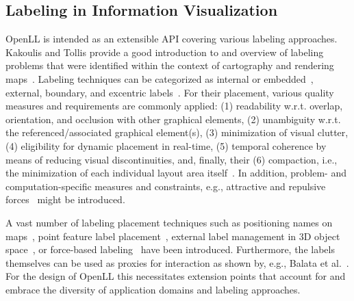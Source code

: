 \subsection{Labeling in Information Visualization} 
\noindent
OpenLL is intended as an extensible API covering various labeling approaches.
Kakoulis and Tollis provide a good introduction to and overview of labeling problems that were identified within the context of cartography and rendering maps~\cite{Kakoulis2013}.
Labeling techniques can be categorized as internal or embedded~\cite{Maass2007}, external, boundary, and excentric labels~\cite{Oeltze-Jafra2014}.
For their placement, various quality measures and requirements are commonly applied:
(1) readability w.r.t. overlap, orientation, and occlusion with other graphical elements, 
(2) unambiguity w.r.t. the referenced/associated graphical element(s), 
(3) minimization of visual clutter, 
(4) eligibility for dynamic placement in real-time,
(5) temporal coherence by means of reducing visual discontinuities, and, finally, their
(6) compaction, i.e., the minimization of each individual layout area itself~\cite{Ali05}.
In addition, problem- and computation-specific measures and constraints, e.g., attractive and repulsive forces~\cite{Balata2014} might be introduced.

A vast number of labeling placement techniques such as positioning names on maps~\cite{Imhof1975}, point feature label placement~\cite{Christensen1995}, external label management in 3D object space~\cite{Tatzgern2014}, or force-based labeling~\cite{Vaaraniemi2012} have been introduced.
Furthermore, the labels themselves can be used as proxies for interaction as shown by, e.g., Balata et al.~\cite{Balata2014}.
For the design of OpenLL this necessitates extension points that account for and embrace the diversity of application domains and labeling approaches.
